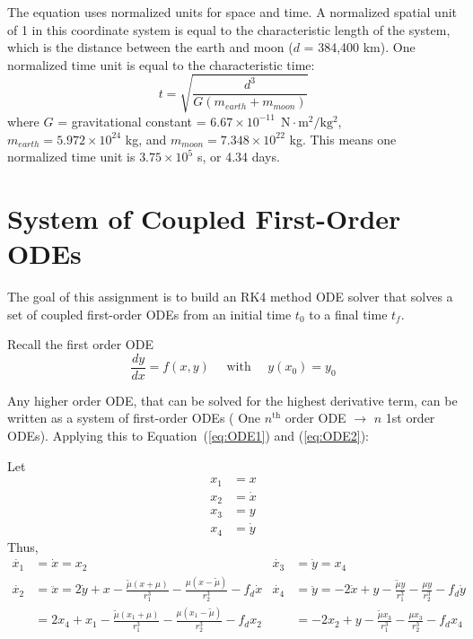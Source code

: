 \documentclass{article}
\newcommand{\deriv}[2]{\frac{d#1}{d#2}}
\begin{document}
\vspace{\baselineskip}

The equation uses normalized units for space and time. A normalized spatial unit of 1 in this coordinate
system is equal to the characteristic length of the system, which is the distance between the earth and moon
($d$ = 384,400 km). One normalized time unit is equal to the characteristic time:
\begin{equation*}
    t = \sqrt{\frac{d^3}{G\left(m_{earth} + m_{moon}\right)}} 
\end{equation*}
where $G$ = gravitational constant = $6.67 \times 10^{-11} \SI{}{\ \N\cdot\m^2/\kg^2}$, $m_{earth} = 5.972 \times 10^{24}$ kg, and $m_{moon} = 7.348 \times 10^{22}$ kg. This means one normalized time unit is $3.75 \times 10^5$ s, or 4.34 days.

\pagebreak

\section{System of Coupled First-Order ODEs}

The goal of this assignment is to build an RK4 method ODE solver that solves a set of coupled first-order ODEs from an initial time $t_0$ to a final time $t_f$.

\vspace{\baselineskip}

Recall the first order ODE
\begin{equation*}
    \deriv{y}{x} = f(x,y) \quad \text{ with } \quad y(x_0) = y_0
\end{equation*}

Any higher order ODE, that can be solved for the highest derivative term, can be written as a system of first-order ODEs (\color{magenta} One $n^{\textrm{th}}$ order ODE $\rightarrow$ $n$ 1st order ODEs\color{white}). Applying this to Equation~(\ref{eq:ODE1}) and (\ref{eq:ODE2}):

\vspace{\baselineskip}

Let
\begin{align*}
    x_1 &= x \\
    x_2 &= \dot{x} \\
    x_3 &= y \\
    x_4 &= \dot{y}
\end{align*}
Thus, 
\begin{align*}
    \dot{x_1} &= \dot{x} = x_2  &  \dot{x_3} &= \dot{y} = x_4
    \\
    \dot{x_2} &= \ddot{x} = 2\dot{y} + x - \frac{\tilde{\mu} \left(x+\mu\right)}{r_1^3} - \frac{\mu \left(x-\tilde{\mu}\right)}{r_2^3} - f_d \dot{x} 
    & \dot{x_4} &= \ddot{y} = -2\dot{x} + y - \frac{\tilde{\mu}y}{r_1^3} - \frac{\mu y}{r_2^3} - f_d\dot{y}
    \\
    &= 2x_4 + x_1 - \frac{\tilde{\mu} \left(x_1+\mu\right)}{r_1^3} - \frac{\mu \left(x_1-\tilde{\mu}\right)}{r_2^3} - f_d x_2
    & &= -2x_2 + y - \frac{\tilde{\mu}x_3}{r_1^3} - \frac{\mu x_3}{r_2^3} - f_d x_4
\end{align*}
\end{document}
